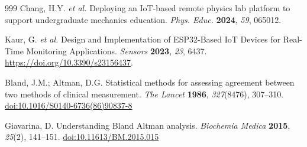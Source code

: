 \documentclass[sensors,article,submit,pdftex]{Definitions/mdpi}
\begin{document}
\begin{thebibliography}{999}
Chang, H.Y. \textit{et al.}
Deploying an IoT-based remote physics lab platform to support undergraduate mechanics education.
\textit{Phys. Educ.} \textbf{2024}, \textit{59}, 065012.

Kaur, G. \textit{et al.}
Design and Implementation of ESP32-Based IoT Devices for Real-Time Monitoring Applications.
\textit{Sensors} \textbf{2023}, \textit{23}, 6437.
\href{https://doi.org/10.3390/s23156437}{https://doi.org/10.3390/s23156437}.


Bland, J.M.; Altman, D.G.
Statistical methods for assessing agreement between two methods of clinical measurement.
\textit{The Lancet} \textbf{1986}, \textit{327}(8476), 307--310.
\href{https://doi.org/10.1016/S0140-6736(86)90837-8}{doi:10.1016/S0140-6736(86)90837-8}

Giavarina, D.
Understanding Bland Altman analysis.
\textit{Biochemia Medica} \textbf{2015}, \textit{25}(2), 141--151.
\href{https://doi.org/10.11613/BM.2015.015}{doi:10.11613/BM.2015.015}

\end{thebibliography}
\end{document}
